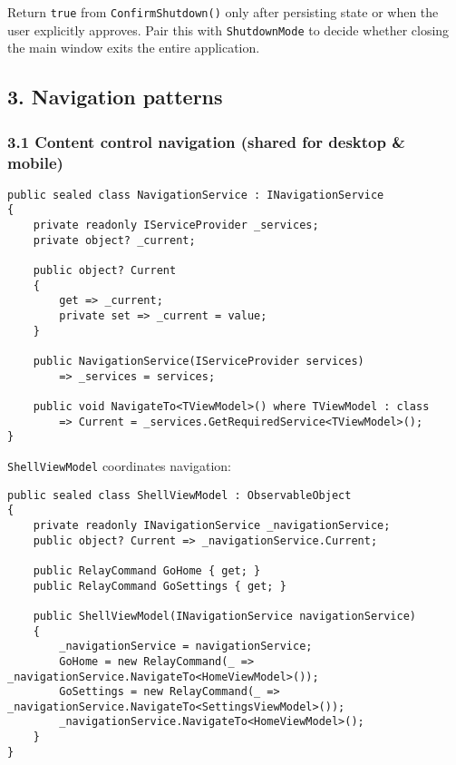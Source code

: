 Return \passthrough{\lstinline!true!} from
\passthrough{\lstinline!ConfirmShutdown()!} only after persisting state
or when the user explicitly approves. Pair this with
\passthrough{\lstinline!ShutdownMode!} to decide whether closing the
main window exits the entire application.

\subsection{3. Navigation patterns}\label{navigation-patterns}

\subsubsection{3.1 Content control navigation (shared for desktop \&
mobile)}\label{content-control-navigation-shared-for-desktop-mobile}

\begin{lstlisting}
public sealed class NavigationService : INavigationService
{
    private readonly IServiceProvider _services;
    private object? _current;

    public object? Current
    {
        get => _current;
        private set => _current = value;
    }

    public NavigationService(IServiceProvider services)
        => _services = services;

    public void NavigateTo<TViewModel>() where TViewModel : class
        => Current = _services.GetRequiredService<TViewModel>();
}
\end{lstlisting}

\passthrough{\lstinline!ShellViewModel!} coordinates navigation:

\begin{lstlisting}
public sealed class ShellViewModel : ObservableObject
{
    private readonly INavigationService _navigationService;
    public object? Current => _navigationService.Current;

    public RelayCommand GoHome { get; }
    public RelayCommand GoSettings { get; }

    public ShellViewModel(INavigationService navigationService)
    {
        _navigationService = navigationService;
        GoHome = new RelayCommand(_ => _navigationService.NavigateTo<HomeViewModel>());
        GoSettings = new RelayCommand(_ => _navigationService.NavigateTo<SettingsViewModel>());
        _navigationService.NavigateTo<HomeViewModel>();
    }
}
\end{lstlisting}

